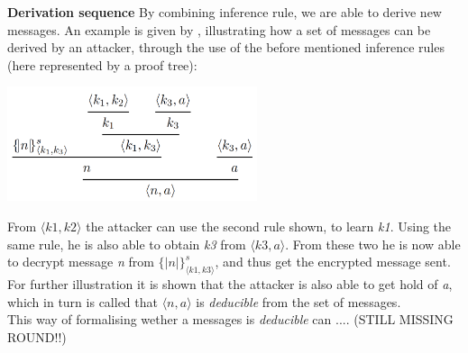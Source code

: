 \noindent \textbf{Derivation sequence}  \qquad
By combining inference rule, we are able to derive new messages. An example is given by \citeauthor{DBLP:journals/ftpl/CortierK14}, illustrating how a set of messages can be derived by an attacker, through the use of the before mentioned inference rules (here represented by a proof tree):
\begin{center}
\includegraphics[width=0.55\textwidth, angle=0]{Graphics/Proof_tree.pdf}
\end{center}
From $\langle k1, k2\rangle$ the attacker can use the second rule shown, to learn \textit{k1}. Using the same rule, he is also able to obtain \textit{k3} from $\langle k3, a\rangle$. From these two he is now able to decrypt message \textit{n} from $\{|n|\}^s_{\langle k1, k3\rangle}$, and thus get the encrypted message sent. For further illustration it is shown that the attacker is also able to get hold of \textit{a}, which in turn is called that $\langle n, a\rangle$ is \textit{deducible} from the set of messages. \\

\noindent This way of formalising wether a messages is \textit{deducible} can .... (STILL MISSING ROUND!!)

 



